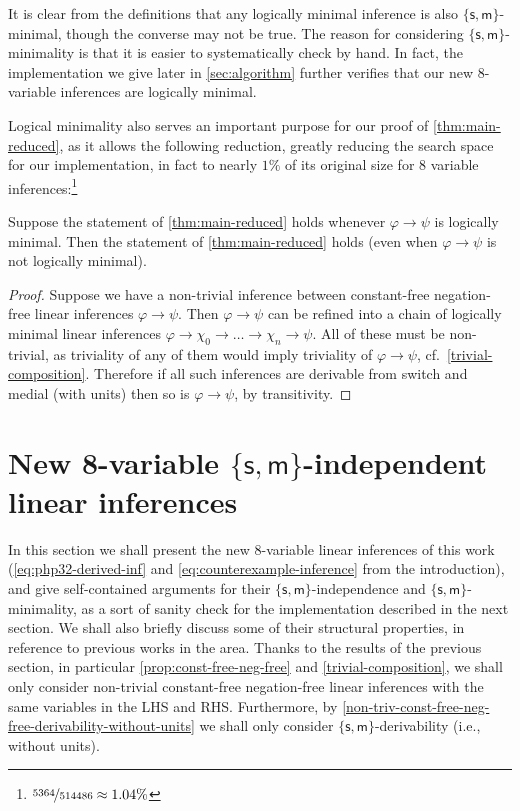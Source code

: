 \documentclass[a4paper, UKenglish, cleveref]{lipics-v2021}
\renewcommand{\phi}{\varphi}
\newcommand{\m}{\ensuremath{\mathsf{m}}}
\newcommand{\s}{\ensuremath{\mathsf{s}}}
\begin{document}
It is clear from the definitions that any logically minimal inference is also \(\{\s,\m\}\)-minimal, though the converse may not be true.
The reason for considering \(\{\s,\m\}\)-minimality is that it is easier to systematically check by hand.
In fact, the implementation we give later in \cref{sec:algorithm} further verifies that our new $8$-variable inferences are logically minimal.
%


Logical minimality also serves an important purpose for our proof of \cref{thm:main-reduced}, as it allows the following reduction, greatly reducing the search space for our implementation, in fact to nearly $1\%$ of its original size for \(8\) variable inferences:\footnote{\(\nicefrac{5364}{514486} \approx 1.04\%\)}

\begin{lemma}\label{lem:minimality}
  Suppose the statement of \cref{thm:main-reduced} holds whenever \(\phi \to \psi\) is logically minimal. Then the statement of \cref{thm:main-reduced} holds (even when \(\phi \to \psi\) is not logically minimal).
\end{lemma}
\begin{proof}
  Suppose we have a non-trivial inference between constant-free negation-free linear inferences \(\phi \to \psi\). Then \(\phi \to \psi\) can be refined into a chain of logically minimal linear inferences \(\phi \to \chi_0 \to \dots \to \chi_n \to \psi\). All of these must be non-trivial, as triviality of any of them would imply triviality of \(\phi \to \psi\), cf.~\cref{trivial-composition}. Therefore if all such inferences are derivable from switch and medial (with units) then so is \(\phi \to \psi\), by transitivity.
\end{proof}

\section{New 8-variable $\{\s,\m\}$-independent linear inferences}
\label{sec:8var-inf}
In this section we shall present the new 8-variable linear inferences of this work (\eqref{eq:php32-derived-inf} and \eqref{eq:counterexample-inference} from the introduction), and give self-contained arguments for their $\{\s,\m\}$-independence and $\{\s,\m\}$-minimality, as a sort of sanity check for the implementation described in the next section.
We shall also briefly discuss some of their structural properties, in reference to previous works in the area.
Thanks to the results of the previous section, in particular \cref{prop:const-free-neg-free} and \cref{trivial-composition}, we shall only consider non-trivial constant-free negation-free linear inferences with the same variables in the LHS and RHS.
Furthermore, by \cref{non-triv-const-free-neg-free-derivability-without-units} we shall only consider $\{\s,\m \}$-derivability (i.e., without units).
\end{document}
